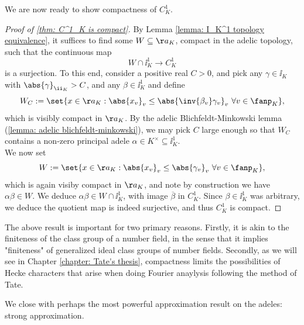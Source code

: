 \documentclass[11pt, x11names, openany]{book}
\begin{document}
We are now ready to show compactness of $C^1_K$.

\begin{proof}[Proof of \ref{thm: C^1_K is compact}]
    By Lemma \ref{lemma: I_K^1 topology equivalence}, it suffices to find some $W \subseteq \aa_K$, compact in the adelic topology, such that the continuous map
    \begin{equation*}
        W \cap \ii_K^1 \to C_K^1
    \end{equation*}
    is a surjection. To this end, consider a positive real $C > 0$, and pick any $\gamma \in \ii_K$ with $\abs{\gamma}_{\ii_K} > C$, and any $\beta \in \ii_K^1$ and define
    \begin{equation*}
        W_C := \set{x \in \aa_K : \abs{x_v}_v \leq \abs{\inv{\beta_v}\gamma_v}_v \ \forall v \in \fanp_K},
    \end{equation*}
    which is visibly compact in $\aa_K$. By the adelic Blichfeldt-Minkowski lemma (\ref{lemma: adelic blichfeldt-minkowski}), we may pick $C$ large enough so that $W_C$ contains a non-zero principal adele $\alpha \in K^\times \subseteq \ii_K^1$.\\
    We now set
    \begin{equation*}
        W := \set{x \in \aa_K : \abs{x_v}_v \leq \abs{\gamma_v}_v \ \forall v \in \fanp_K},
    \end{equation*}
    which is again visiby compact in $\aa_K$, and note by construction we have $\alpha \beta \in W$. We deduce $\alpha \beta \in W \cap \ii_K^1$, with image $\overline{\beta}$ in $C_K^1$. Since $\beta \in \ii_K^1$ was arbitrary, we deduce the quotient map is indeed surjective, and thus $C_K^1$ is compact.
\end{proof}

\begin{remark}
    The above result is important for two primary reasons. Firstly, it is akin to the finiteness of the class group of a number field, in the sense that it implies "finiteness" of generalized ideal class groups of number fields. Secondly, as we will see in Chapter \ref{chapter: Tate's thesis}, compactness limits the possibilities of Hecke characters that arise when doing Fourier anaylysis following the method of Tate.
\end{remark}


We close with perhaps the most powerful approximation result on the adeles: strong approximation.
\end{document}
